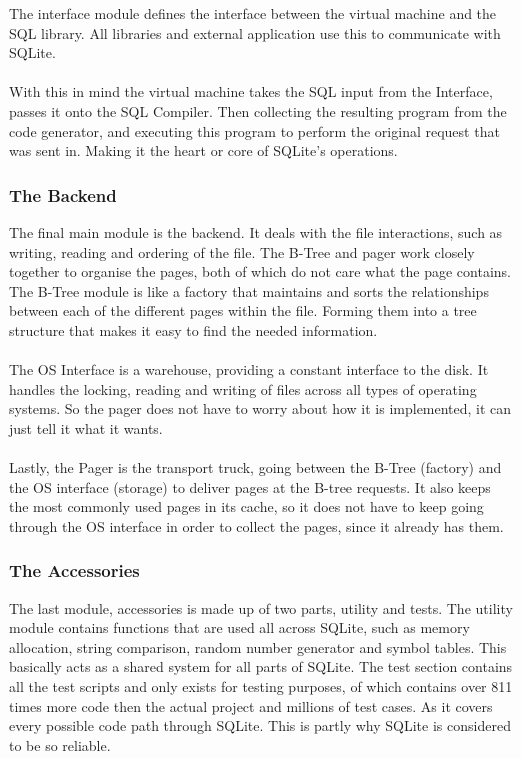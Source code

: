 The interface module defines the interface between the virtual machine and the SQL library. All libraries and external application use this to communicate with SQLite.
\\\\
With this in mind the virtual machine takes the SQL input from the Interface, passes it onto the SQL Compiler. Then collecting the resulting program from the code generator, and executing this program to perform the original request that was sent in. Making it the heart or core of SQLite's operations.

\subsubsection{The Backend}
\label{subsec:how_sqlite_backend}

The final main module is the backend. It deals with the file interactions, such as writing, reading and ordering of the file. The B-Tree and pager work closely together to organise the pages, both of which do not care what the page contains. The B-Tree module is like a factory that maintains and sorts the relationships between each of the different pages within the file. Forming them into a tree structure that makes it easy to find the needed information. 
\\\\
The OS Interface is a warehouse, providing a constant interface to the disk. It handles the locking, reading and writing of files across all types of operating systems. So the pager does not have to worry about how it is implemented, it can just tell it what it wants.
\\\\
Lastly, the Pager is the transport truck, going between the B-Tree (factory) and the OS interface (storage) to deliver pages at the B-tree requests. It also keeps the most commonly used pages in its cache, so it does not have to keep going through the OS interface in order to collect the pages, since it already has them.

\subsubsection{The Accessories}
\label{subsec:how_sqlite_accessories}

The last module, accessories is made up of two parts, utility and tests. The utility module contains functions that are used all across SQLite, such as memory allocation, string comparison, random number generator and symbol tables. This basically acts as a shared system for all parts of SQLite. The test section contains all the test scripts and only exists for testing purposes, of which contains over 811 times more code then the actual project and millions of test cases. As it covers every possible code path through SQLite. This is partly why SQLite is considered to be so reliable. 
\\\\
